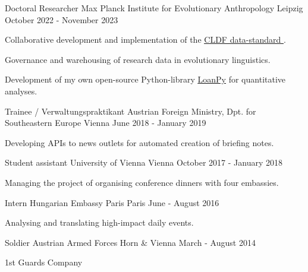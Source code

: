 \begin{cventries}

  \cventry
    {Doctoral Researcher} %
    {Max Planck Institute for Evolutionary Anthropology} %
    {Leipzig} %
    {October 2022 - November 2023} %
    {
      \begin{cvitems} %
      \item{Collaborative development and implementation of the \underline{\href{https://cldf.clld.org/}{CLDF data-standard }}.}
      \item{Governance and warehousing of research data in evolutionary linguistics.}
      \item{Development of my own open-source Python-library \underline{\href{https://pypi.org/project/loanpy/}{LoanPy}} for quantitative analyses.}
      \end{cvitems}
    }
    
  \cventry
    {Trainee / Verwaltungspraktikant} %
    {Austrian Foreign Ministry, Dpt. for Southeastern Europe} %
    {Vienna} %
    {June 2018 - January 2019} %
    {
      \begin{cvitems} %
        \item{Developing APIs to news outlets for automated creation of briefing notes.}
      \end{cvitems}
    }

  \cventry
    {Student assistant} %
    {University of Vienna} %
    {Vienna} %
    {October 2017 - January 2018} %
    {
    \begin{cvitems}
    \item{Managing the project of organising conference dinners with four embassies.}
    \end{cvitems}
    }
    
  \cventry
    {Intern} %
    {Hungarian Embassy Paris} %
    {Paris} %
    {June - August 2016} %
    {
    \begin{cvitems}
    \item{Analysing and translating high-impact daily events.}
    \end{cvitems}
    }

  \cventry
    {Soldier} %
    {Austrian Armed Forces} %
    {Horn \& Vienna} %
    {March - August 2014} %
    {
    \begin{cvitems}
    \item{1st Guards Company}
    \end{cvitems}
    }
        
\end{cventries}

